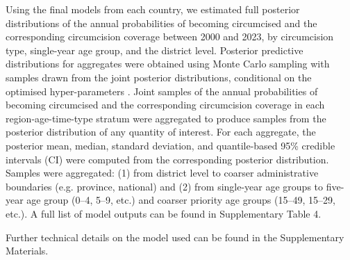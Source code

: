 \documentclass{article}
\begin{document}
Using the final models from each country, we estimated full posterior distributions of the annual probabilities of becoming circumcised and the corresponding circumcision coverage between 2000 and 2023, by circumcision type, single-year age group, and the district level. Posterior predictive distributions for aggregates were obtained using Monte Carlo sampling with samples drawn from the joint posterior distributions, conditional on the optimised hyper-parameters \cite{eaton2021naomi}. Joint samples of the annual probabilities of becoming circumcised and the corresponding circumcision coverage in each region-age-time-type stratum were aggregated to produce samples from the posterior distribution of any quantity of interest. For each aggregate, the posterior mean, median, standard deviation, and quantile-based 95\% credible intervals (CI) were computed from the corresponding posterior distribution. Samples were aggregated: (1) from district level to coarser administrative boundaries (e.g. province, national) and (2) from single-year age groups to five-year age group (0--4, 5--9, etc.) and coarser priority age groups (15--49, 15--29, etc.). A full list of model outputs can be found in Supplementary Table 4. 

Further technical details on the model used can be found in the Supplementary Materials. 


\newpage 
\printbibliography

\end{document}
